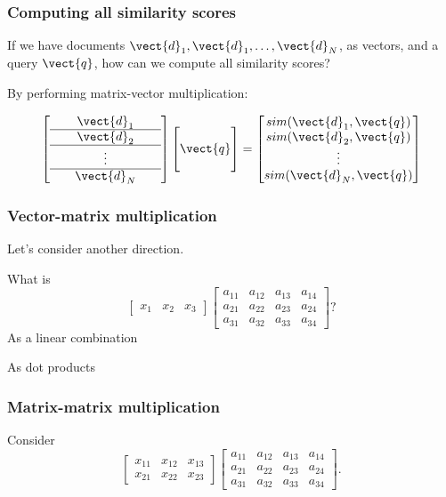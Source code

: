 \begin{frame}
  \frametitle{Computing all similarity scores}

  If we have documents $\vect{d}_1,\vect{d}_1,\ldots,\vect{d}_N$, as
  vectors, and a query $\vect{q}$, how can we compute all similarity
  scores?

  \pause
  By performing matrix-vector multiplication:
  
  \[
  \left[
    \begin{array}{c}
      \ \ \ \ \ \vect{d}_1 \ \ \ \ \ \\
      \hline
      \vect{d}_2 \\
      \hline
      \vdots \\
      \hline
      \vect{d}_N
    \end{array}
    \right]
  \begin{bmatrix}
    \\
    \vect{q}\\
    \\
  \end{bmatrix}
  =
  \begin{bmatrix}
    sim(\vect{d}_1,\vect{q}) \\
    sim(\vect{d}_2,\vect{q}) \\
    \vdots \\
    sim(\vect{d}_N,\vect{q})
  \end{bmatrix}
  \]
\end{frame}

\begin{frame}
  \frametitle{Vector-matrix multiplication}

  Let's consider another direction.
  
  What is
  {\small
  \[
  \begin{bmatrix}
    x_1 & x_2 & x_3
  \end{bmatrix}
  \begin{bmatrix}
    a_{11} & a_{12} & a_{13} & a_{14} \\
    a_{21} & a_{22} & a_{23} & a_{24} \\
    a_{31} & a_{32} & a_{33} & a_{34}
  \end{bmatrix}?
  \]
  }
  \pause
  As a linear combination 
  \vspace{1in}

  \pause
  As dot products
  \vspace{1in}
\end{frame}

\begin{frame}
  \frametitle{Matrix-matrix multiplication}

  Consider
  \[
  \begin{bmatrix}
    x_{11} & x_{12} & x_{13} \\
    x_{21} & x_{22} & x_{23}
  \end{bmatrix}
  \begin{bmatrix}
    a_{11} & a_{12} & a_{13} & a_{14} \\
    a_{21} & a_{22} & a_{23} & a_{24} \\
    a_{31} & a_{32} & a_{33} & a_{34}
  \end{bmatrix}.
  \]
\end{frame}

